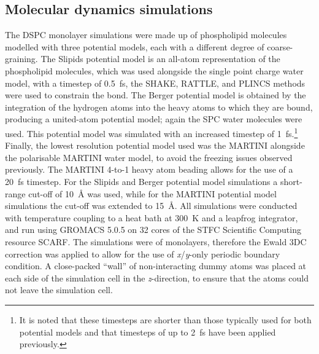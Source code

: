 \subsection{Molecular dynamics simulations}
The DSPC monolayer simulations were made up of phospholipid molecules modelled with three potential models, each with a different degree of coarse-graining.
The Slipids potential model is an all-atom representation of the phospholipid molecules,\autocite{jambeck_derivation_2012} which was used alongside the single point charge water model,\autocite[abbreviated to SPC]{berendsen_missing_1987} with a timestep of \SI{0.5}{\femto\second}, the SHAKE, RATTLE, and PLINCS methods were used to constrain the  bond.\autocite{miyamoto_settle_1992,hess_p-lincs_2008}
The Berger potential model is obtained by the integration of the hydrogen atoms into the heavy atoms to which they are bound, producing a united-atom potential model;\autocite{berger_molecular_1997} again the SPC water molecules were used.
This potential model was simulated with an increased timestep of \SI{1}{\femto\second}.\footnote{It is noted that these timesteps are shorter than those typically used for both potential models and that timesteps of up to \SI{2}{\femto\second} have been applied previously.}
Finally, the lowest resolution potential model used was the MARTINI\autocite{marrink_martini_2007} alongside the polarisable MARTINI water model,\autocite{yesylevskyy_polarizable_2010} to avoid the freezing issues observed previously.\autocite{koutsioubas_combined_2016}
The MARTINI 4-to-1 heavy atom beading allows for the use of a \SI{20}{\femto\second} timestep.
For the Slipids and Berger potential model simulations a short-range cut-off of \SI{10}{\angstrom} was used, while for the MARTINI potential model simulations the cut-off was extended to \SI{15}{\angstrom}.
All simulations were conducted with temperature coupling to a heat bath at \SI{300}{\kelvin} and a leapfrog integrator, and run using GROMACS 5.0.5\autocite{berendsen_gromacs_1995,lindahl_gromacs_2001,van_der_spoel_gromacs_2005,hess_gromacs_2008} on \num{32} cores of the STFC Scientific Computing resource SCARF.
The simulations were of monolayers, therefore the Ewald 3DC correction was applied to allow for the use of \emph{x}/\emph{y}-only periodic boundary condition.\autocite{yeh_ewald_1999}
A close-packed ``wall'' of non-interacting dummy atoms was placed at each side of the simulation cell in the \emph{z}-direction, to ensure that the atoms could not leave the simulation cell.

